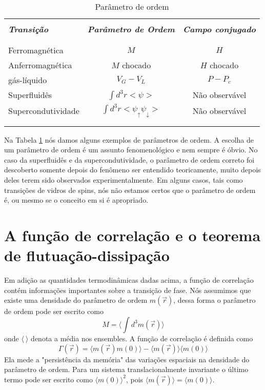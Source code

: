 \begin{table}[h]
\renewcommand{\tablename}{{\bf Tabela}}
\caption{Parâmetro de ordem}
\begin{center}
\vspace{0.2cm}
\begin{tabular}{l c c}
\hline
\\[-0.3cm]
{\bf\it Transição} & {\bf\it  Parâmetro de Ordem}  & {\bf\it Campo conjugado}\\
\\[-0.4cm]
\hline
\\[-0.3cm]
Ferromagnética     & $M$ & $H$\\[0.3cm]
Anferromagnética   & $M$ chocado & $H$ chocado\\[0.3cm]
gás-líquido        & $V_{G}-V_{L}$ & $P-P_{c}$\\[0.3cm]
Superfluidês       & $\int d^{3}r <\psi> $ & Não observável\\[0.3cm]
Supercondutividade & $\int d^{3}r <\psi_{\uparrow} \psi_{\downarrow}>$ & Não observável\\
\\[-0.3cm]
\hline\\
\end{tabular}
\end{center}
\label{parametros_de_ordem}
\end{table}
Na Tabela \ref{parametros_de_ordem} nós damos alguns exemplos de parâmetros de ordem. A escolha de um parâmetro de ordem é um assunto fenomenológico e nem sempre é óbvio. No caso da superfluidês e da supercondutividade, o parâmetro de ordem correto foi descoberto somente depois do fenômeno ser entendido teoricamente, muito depois deles terem sido observados experimentalmente. Em alguns casos, tais como transições de vidros de spins, nós não estamos certos que o parâmetro de ordem é, ou mesmo se o conceito em si é apropriado.

\section{A função de correlação e o teorema de flutuação-dissipação}
\noindent

Em adição as quantidades termodinâmicas dadas acima, a função de correlação contém informações importantes sobre a transição de fase. Nós assumimos que existe uma densidade do parâmetro de ordem $m(\vec{r})$, dessa forma o parâmetro de ordem pode ser escrito como
\begin{equation}
M=\langle \int d^{3} m(\vec{r}) \rangle
\label{def_M}
\end{equation}
onde $\langle ~ \rangle$ denota a média nos ensembles. A função de correlação é definida como
\begin{equation}
\Gamma(\vec{r})=\langle m(\vec{r}) m(0) \rangle- \langle m(\vec{r})\rangle \langle m(0)\rangle
\label{funcao_de_correlacao}
\end{equation}
Ela mede a "persistência da memória" das variações espaciais na densidade do parâmetro de ordem. Para um sistema translacionalmente invariante o último termo pode ser escrito como $\langle m(0)\rangle^{2}$, pois $\langle m(\vec{r})\rangle=\langle m(0)\rangle$.

